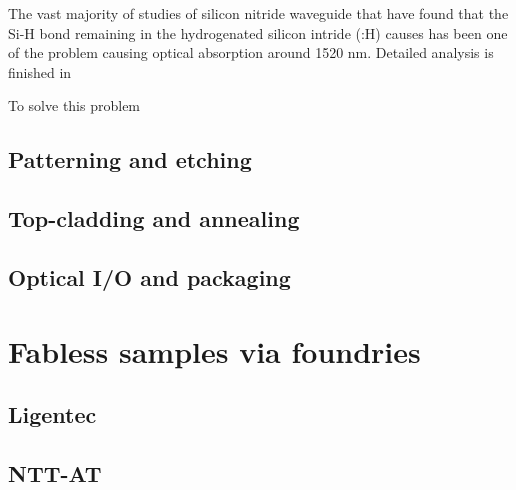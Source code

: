 The vast majority of studies of silicon nitride waveguide that have found that the Si-H bond remaining in the hydrogenated silicon intride (:H) causes 
\cite{Shaw2005}
has been one of the problem causing optical absorption around 1520 nm. Detailed analysis is finished in 

To solve this problem 


\subsection{Patterning and etching}

\subsection{Top-cladding and annealing}

\subsection{Optical I/O and packaging}

\section{Fabless samples via foundries}

\subsection{Ligentec}

\subsection{NTT-AT}

